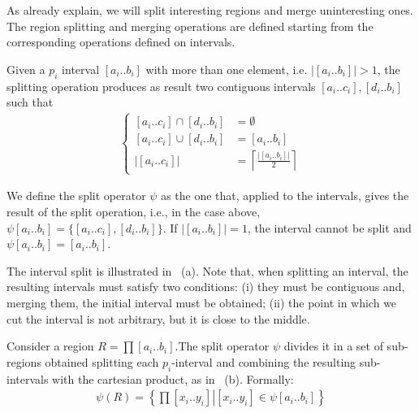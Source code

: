 As already explain, we will split interesting regions and merge uninteresting ones. The region splitting and merging operations are defined starting from the corresponding operations defined on intervals.
\begin{definition}
Given a $p_i$ interval $\left[a_{i}..b_{i}\right]$ with more than one element, i.e. $\left|\left[a_{i}..b_{i}\right]\right|>1$, the splitting operation produces as result two contiguous intervals $\left[a_{i}..c_{i}\right],\left[d_{i}..b_{i}\right]$
 such that
	\begin{align}
		\begin{cases}
		\left[a_{i}..c_{i}\right]\cap\left[d_{i}..b_{i}\right] & =\emptyset\\
		\left[a_{i}..c_{i}\right]\cup\left[d_{i}..b_{i}\right] & =\left[a_{i}..b_{i}\right]\\
		\left|\left[a_{i}..c_{i}\right]\right| & =\left\lceil \frac{\left|\left[a_{i}..b_{i}\right]\right|}{2}\right\rceil 
		\end{cases}
	\end{align}

We define the split operator $\psi$ as the one that, applied to the intervals, gives the result of the split operation, i.e., in the case above, $\psi \left[a_{i}..b_{i}\right]=\lbrace \left[a_{i}..c_{i}\right],\left[d_{i}..b_{i}\right] \rbrace$.
If $\left|\left[a_{i}..b_{i}\right]\right|=1$, the interval
cannot be split and $\psi \left[a_{i}..b_{i}\right]=\left[a_{i}..b_{i}\right]$.
\end{definition}

The interval split is illustrated in ~(a). Note that, when splitting an interval, the resulting intervals must satisfy two conditions: (i) they must be contiguous and, merging them, the initial interval must be obtained; (ii) the point in which we cut the interval is not arbitrary, but it is close to the middle.

\begin{definition}
\label{pers02.def:Splitting-a-region}
Consider a region $R=\prod\left[a_{i}..b_{i}\right]$.The split operator $\psi$ divides it in a set of sub-regions obtained splitting each $p_i$-interval and combining the resulting sub-intervals with the cartesian product, as in ~(b). Formally:
	\begin{align}
		\psi(R) = \left\{ \left.\prod\left[x_{i}..y_{i}\right]\right|\left[x_{i}..y_{i}\right]\in \psi\left[a_{i}..b_{i}\right]  \right\} 
	\end{align}

\end{definition}


